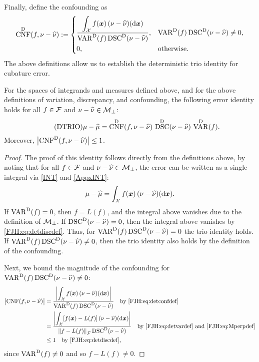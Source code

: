 \documentclass[graybox,footinfo]{svmult}
\DeclareMathOperator{\algn}{CNF}
\DeclareMathOperator{\disc}{DSC}
\DeclareMathOperator{\Var}{VAR}
\begin{document}
Finally, define the confounding as 
	\begin{equation} \label{FJH:eq:detconfdef}
\algn^\Dt(f,\nu - \hnu): =  \begin{cases} \displaystyle 
\frac{\displaystyle\int_{\cx} f(\bsx) \, (\nu - \hnu)(\D 
	\bsx)}{\Var^\Dt(f)\disc^\Dt(\nu - \hnu)},  & 
\Var^\Dt(f)\disc^\Dt(\nu - \hnu) \ne 0, \\[2ex]
0, & \text{otherwise}.
\end{cases}
\end{equation}
The above definitions allow us to establish the deterministic trio identity for cubature 
error.

\begin{theorem}  \label{FJH:thm:dtrio} For the spaces 
of integrands and 
measures defined above, and for the above definitions of variation, discrepancy, and 
confounding, the following error identity holds for all $f \in \mathcal{F}$ and $\nu - \widehat{\nu}  \in 
\mathcal{M}_\bot$: 
\begin{equation} \tag{DTRIO} \label{FJH:eq:dtrio}
\mu - \hmu  = \algn^\Dt(f,\nu - \hnu) \, \disc^\Dt(\nu - \hnu) \, \Var^{\Dt}(f).
\end{equation}
Moreover, $\abs{\algn^\Dt(f,\nu - \hnu)} \le 1$. 
\end{theorem}
\begin{proof}  The proof of this identity follows directly from the definitions above, by 
noting that for all $f \in \mathcal{F}$ and $\nu - \widehat{\nu}  \in \mathcal{M}_\bot$, the error can be written as a 
single integral via \eqref{INT} and \eqref{AppxINT}:
	\begin{equation} \label{FJH:eq:err_as_int}
	\mu - \hmu   =  \int_{\cx} f(\bsx) \, (\nu - \hnu)(\D \bsx).
	\end{equation}
	If $\Var^{\Dt}(f) = 0$, then $f = L(f)$, and the integral above vanishes due to the 
	definition of $\mathcal{M}_{\bot}$.  If $\disc^\Dt(\nu - \hnu) = 0$, then the integral above 
	vanishes by \eqref{FJH:eq:detdiscdef}.  Thus, for $\Var^{\Dt}(f) \disc^\Dt(\nu - \hnu) = 
	0$ 
	the trio identity holds. If $\Var^{\Dt}(f) \disc^\Dt(\nu - \hnu) \ne 0$, then the trio 
	identity also holds by the definition of the confounding.
	
	Next, we bound the magnitude of the confounding for $\Var^{\Dt}(f) \disc^\Dt(\nu - 
	\hnu) \ne 0$: 
	\begin{align*}
	\abs{\algn(f,\nu - \hnu)} & = 
		\frac{\biggl \lvert\displaystyle\int_{\cx} f(\bsx) \, (\nu - \hnu)(\D 
			\bsx) \biggr \rvert}{\Var^\Dt(f)\disc^\Dt(\nu - \hnu)} \quad \text{by 
			\eqref{FJH:eq:detconfdef}}\\
		& = \frac{\biggl \lvert\displaystyle\int_{\cx} [f(\bsx) - L(f)] \, (\nu - \hnu)(\D 
			\bsx) \biggr \rvert}{\norm{f-L(f)}_{\cf}\disc^\Dt(\nu - \hnu)} \quad \text{by 
			\eqref{FJH:eq:detvardef} and \eqref{FJH:eq:Mperpdef}} \\
		& \le 1 \quad \text{by \eqref{FJH:eq:detdiscdef}},
\end{align*}
since $\Var^{\Dt}(f) \ne 0$ and so $f - L(f) \ne 0$.
\end{proof}
\end{document}
